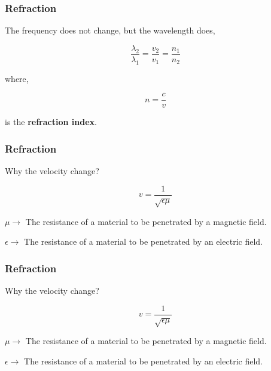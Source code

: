 \documentclass[]{beamer}
\begin{document}


\begin{frame}

\frametitle{Refraction}



The frequency does not change, but the wavelength does,

\pause

\begin{equation*}
 \frac{\lambda_2}{\lambda_1}=\frac{v_2}{v_1}=\frac{n_1}{n_2}
\end{equation*}
\pause

where,

\begin{equation}
n=\frac{c}{v}
\end{equation}
\pause
\vspace{3mm}

is the \textbf{refraction index}.


  \end{frame}




\begin{frame}

\frametitle{Refraction}


Why the velocity change?
\pause

\begin{equation}
v=\frac{1}{\sqrt{\epsilon \mu}}
\end{equation}


$\mu\rightarrow$ The resistance of a material to be penetrated by a magnetic field.

\pause
\vspace{3mm}

$\epsilon\rightarrow$ The resistance of a material to be penetrated by an electric field.



  \end{frame}




\begin{frame}

\frametitle{Refraction}


Why the velocity change?
\pause

\begin{equation}
v=\frac{1}{\sqrt{\epsilon \mu}}
\end{equation}


$\mu\rightarrow$ The resistance of a material to be penetrated by a magnetic field.

\pause
\vspace{3mm}

$\epsilon\rightarrow$ The resistance of a material to be penetrated by an electric field.



  \end{frame}
\end{document}
